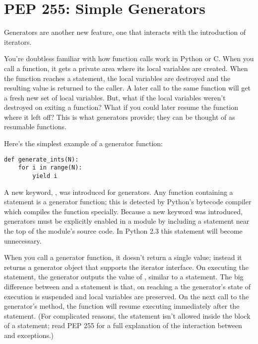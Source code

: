\documentclass{howto}
\begin{document}
\section{PEP 255: Simple Generators}

Generators are another new feature, one that interacts with the
introduction of iterators.

You're doubtless familiar with how function calls work in Python or
C.  When you call a function, it gets a private area where its local
variables are created.  When the function reaches a 
statement, the local variables are destroyed and the resulting value
is returned to the caller.  A later call to the same function will get
a fresh new set of local variables.  But, what if the local variables
weren't destroyed on exiting a function?  What if you could later
resume the function where it left off?  This is what generators
provide; they can be thought of as resumable functions.

Here's the simplest example of a generator function:

\begin{verbatim}
def generate_ints(N):
    for i in range(N):
        yield i
\end{verbatim}

A new keyword, , was introduced for generators.  Any
function containing a  statement is a generator
function; this is detected by Python's bytecode compiler which
compiles the function specially.  Because a new keyword was
introduced, generators must be explicitly enabled in a module by
including a  statement near
the top of the module's source code.  In Python 2.3 this statement
will become unnecessary.

When you call a generator function, it doesn't return a single value;
instead it returns a generator object that supports the iterator
interface.  On executing the  statement, the generator
outputs the value of , similar to a 
statement.  The big difference between  and a
 statement is that, on reaching a  the
generator's state of execution is suspended and local variables are
preserved.  On the next call to the generator's  method,
the function will resume executing immediately after the
 statement.  (For complicated reasons, the
 statement isn't allowed inside the  block
of a  statement; read PEP 255 for a full
explanation of the interaction between  and
exceptions.)
\end{document}

